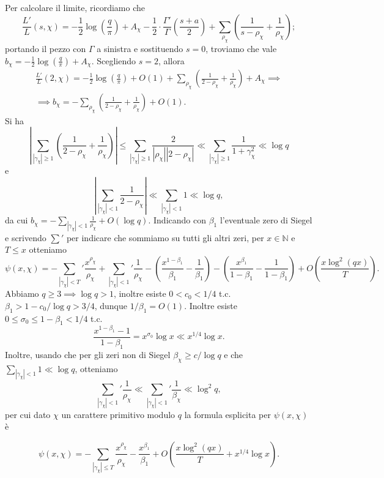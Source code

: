 Per calcolare il limite, ricordiamo che
$$\frac{L'}{L}(s,\chi)=-\frac{1}{2}\log\left(\frac{q}{\pi}\right)+A_\chi-\frac{1}{2}\cdot\frac{\Gamma'}{\Gamma}\left(\frac{s+a}{2}\right)+\sum_{\rho_\chi} \left(\frac{1}{s-\rho_\chi}+\frac{1}{\rho_\chi}\right);$$
portando il pezzo con $\Gamma$ a sinistra e sostituendo $s=0$, troviamo che vale
$b_\chi=-\frac{1}{2}\log\left(\frac{q}{\pi}\right)+A_\chi$. Scegliendo $s=2$, allora
\begin{gather*}
  \frac{L'}{L}(2,\chi)=-\frac{1}{2}\log\left(\frac{q}{\pi}\right)+O(1)+\sum_{\rho_\chi}\left(\frac{1}{2-\rho_\chi}+\frac{1}{\rho_\chi}\right)+A_\chi \implies \\
  \implies b_\chi=-\sum_{\rho_\chi}\left(\frac{1}{2-\rho_\chi}+\frac{1}{\rho_\chi}\right)+O(1).
\end{gather*}
Si ha
$$\left|\sum_{|\gamma_\chi| \ge 1} \left(\frac{1}{2-\rho_\chi}+\frac{1}{\rho_\chi}\right)\right| \le \sum_{|\gamma_\chi| \ge 1} \frac{2}{|\rho_\chi||2-\rho_\chi|} \ll \sum_{|\gamma_\chi| \ge 1} \frac{1}{1+\gamma_\chi^2} \ll \log{q}$$
e
$$\left|\sum_{|\gamma_\chi|<1} \frac{1}{2-\rho_\chi} \right| \ll \sum_{|\gamma_\chi|<1} 1 \ll \log{q},$$
da cui $\displaystyle b_\chi=-\sum_{|\gamma_\chi|<1} \frac{1}{\rho_\chi}+O(\log{q})$.
Indicando con $\beta_1$ l'eventuale zero di Siegel e scrivendo $\displaystyle \sum'$ per indicare che sommiamo su tutti gli altri zeri, per $x \in \mathbb{N}$ e $T \le x$ otteniamo
$$\psi(x,\chi)=-\sum_{|\gamma_\chi|<T}' \frac{x^{\rho_\chi}}{\rho_\chi}+\sum_{|\gamma_\chi|<1}' \frac{1}{\rho_\chi}-\left(\frac{x^{1-\beta_1}}{\beta_1}-\frac{1}{\beta_1}\right)-\left(\frac{x^{\beta_1}}{1-\beta_1}-\frac{1}{1-\beta_1}\right)+O\left(\frac{x\log^2(qx)}{T}\right).$$
Abbiamo $q \ge 3 \implies \log{q}>1$, inoltre esiste $0<c_0<1/4$ t.c. $\beta_1>1-c_0/\log{q}>3/4$, dunque $1/\beta_1=O(1)$. Inoltre esiste $0 \le \sigma_0 \le 1-\beta_1<1/4$ t.c.
$$\frac{x^{1-\beta_1}-1}{1-\beta_1}=x^{\sigma_0}\log{x} \ll x^{1/4}\log{x}.$$
Inoltre, usando che per gli zeri non di Siegel $\beta_\chi \ge c/\log{q}$ e che $\displaystyle \sum_{|\gamma_\chi|<1} 1 \ll \log{q}$, otteniamo
$$\sum_{|\gamma_\chi|<1}' \frac{1}{\rho_\chi} \ll \sum_{|\gamma_\chi|<1}' \frac{1}{\beta_\chi} \ll \log^2{q},$$
per cui dato $\chi$ un carattere primitivo modulo $q$ la formula esplicita per $\psi(x,\chi)$ è

\begin{equation} \label{expl}
  \psi(x,\chi)=-\sum_{|\gamma_\chi| \le T} \frac{x^{\rho_\chi}}{\rho_\chi}-\frac{x^{\beta_1}}{\beta_1}+O\left(\frac{x\log^2(qx)}{T}+x^{1/4}\log{x}\right).
\end{equation}

